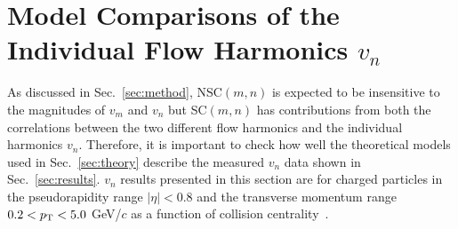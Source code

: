 \appendix
\section{Model Comparisons of the Individual Flow Harmonics $v_n$}
\label{sec:vn}
As discussed in Sec.~\ref{sec:method}, NSC$(m,n)$ is expected to be insensitive to the magnitudes of $v_{m}$ and $v_{n}$ but SC$(m,n)$ has contributions from both the correlations between the two different flow harmonics and the individual harmonics $v_{n}$. Therefore, it is important to check how well the theoretical models used in Sec.~\ref{sec:theory} describe the measured $v_n$ data shown in Sec.~\ref{sec:results}. $v_n$ results presented in this section are for charged particles in the pseudorapidity range $|\eta| < 0.8$ and the transverse momentum range $0.2 < p_{\rm T} < 5.0$ GeV/$c$ as a function of collision centrality~\cite{Adam:2016izf}.

